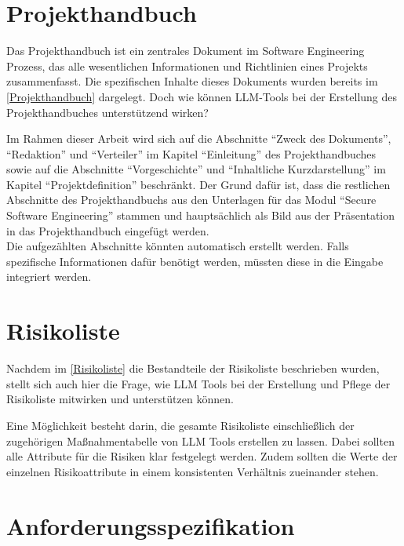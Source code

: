 \section{Projekthandbuch}  \label{LLMProjekthandbuch}

Das Projekthandbuch ist ein zentrales Dokument im Software Engineering Prozess, das alle wesentlichen Informationen und 
Richtlinien eines Projekts zusammenfasst. Die spezifischen Inhalte dieses Dokuments wurden bereits im 
\autoref{Projekthandbuch} dargelegt. Doch wie können LLM-Tools bei der Erstellung des 
Projekthandbuches unterstützend wirken?

Im Rahmen dieser Arbeit wird sich auf die Abschnitte ``Zweck des Dokuments'', ``Redaktion'' und ``Verteiler'' im Kapitel 
``Einleitung'' des Projekthandbuches sowie auf die Abschnitte ``Vorgeschichte'' und ``Inhaltliche Kurzdarstellung'' im 
Kapitel ``Projektdefinition'' beschränkt. Der Grund dafür ist, dass die restlichen Abschnitte des Projekthandbuchs aus den 
Unterlagen für das Modul ``Secure Software Engineering'' stammen und hauptsächlich als Bild aus der Präsentation in das 
Projekthandbuch eingefügt werden.\\
Die aufgezählten Abschnitte könnten automatisch erstellt werden. Falls spezifische Informationen dafür benötigt 
werden, müssten diese in die Eingabe integriert werden.

\section{Risikoliste}  \label{LLMRisikoliste}

Nachdem im \autoref{Risikoliste} die Bestandteile der Risikoliste beschrieben wurden, stellt sich auch hier die Frage, 
wie LLM Tools bei der Erstellung und Pflege der Risikoliste mitwirken und unterstützen können.

Eine Möglichkeit besteht darin, die gesamte Risikoliste einschließlich der zugehörigen Maßnahmentabelle von LLM Tools 
erstellen zu lassen. Dabei sollten alle Attribute für die Risiken klar festgelegt werden. Zudem sollten die Werte 
der einzelnen Risikoattribute in einem konsistenten Verhältnis zueinander stehen.


\section{Anforderungsspezifikation}  \label{LLMAnforderungsspezifikation}

